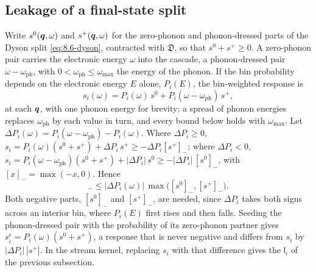 \subsection{Leakage of a final-state split}

Write $s^0(\bm{q},\omega)$ and $s^+(\bm{q},\omega)$ for the zero-phonon and phonon-dressed parts of the Dyson split \cref{eq:8.6-dyson}, contracted with $\mathfrak{D}$, so that $s^0 + s^+ \ge 0$. A zero-phonon pair carries the electronic energy $\omega$ into the cascade, a phonon-dressed pair $\omega - \omega_{\mathrm{ph}}$, with $0 < \omega_{\mathrm{ph}} \le \omega_{\mathrm{max}}$ the energy of the phonon. If the bin probability depends on the electronic energy $E$ alone, $P_i(E)$, the bin-weighted response is
\begin{equation*}
  s_i(\omega) = P_i(\omega)\,s^0 + P_i(\omega - \omega_{\mathrm{ph}})\,s^+ ,
\end{equation*}
at each $\bm{q}$, with one phonon energy for brevity; a spread of phonon energies replaces $\omega_{\mathrm{ph}}$ by each value in turn, and every bound below holds with $\omega_{\mathrm{max}}$. Let $\Delta P_i(\omega) = P_i(\omega - \omega_{\mathrm{ph}}) - P_i(\omega)$. Where $\Delta P_i \ge 0$, $s_i = P_i(\omega)(s^0 + s^+) + \Delta P_i\,s^+ \ge -\Delta P_i[s^+]_-$; where $\Delta P_i < 0$, $s_i = P_i(\omega - \omega_{\mathrm{ph}})(s^0 + s^+) + |\Delta P_i|\,s^0 \ge -|\Delta P_i|\,[s^0]_-$, with $[x]_- = \max(-x, 0)$. Hence
\begin{equation*}
  [s_i]_- \le |\Delta P_i(\omega)|\,\max\bigl([s^0]_-, [s^+]_-\bigr) .
\end{equation*}
Both negative parts, $[s^0]_-$ and $[s^+]_-$, are needed, since $\Delta P_i$ takes both signs across an interior bin, where $P_i(E)$ first rises and then falls. Seeding the phonon-dressed pair with the probability of its zero-phonon partner gives $s_i^{\mathrm{c}} = P_i(\omega)(s^0 + s^+)$, a response that is never negative and differs from $s_i$ by $|\Delta P_i|\,|s^+|$. In the stream kernel, replacing $s_i$ with that difference gives the $\mathsf{l}_i$ of the previous subsection.

